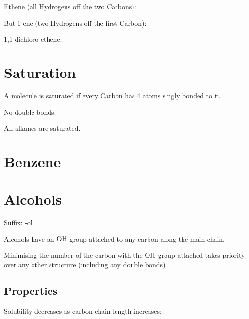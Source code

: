 \documentclass[a4paper,11pt]{article}
\begin{document}
Ethene (all Hydrogens off the two Carbons):

\begin{center}
\end{center}

But-1-ene (two Hydrogens off the first Carbon):

\begin{center}
\end{center}

1,1-dichloro ethene:

\begin{center}
\end{center}




\section{Saturation}

A molecule is saturated if every Carbon has 4 atoms singly bonded to it.

No double bonds.

All alkanes are saturated.



\section{Benzene}



\section{Alcohols}

Suffix: -ol

Alcohols have an $\ce{OH}$ group attached to any carbon along the main chain.

Minimising the number of the carbon with the $\ce{OH}$ group attached takes
priority over any other structure (including any double bonds).


\subsection{Properties}

Solubility decreases as carbon chain length increases:
\end{document}
